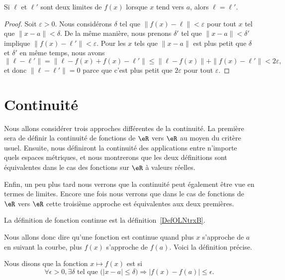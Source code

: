 \begin{lemma}
	Si $\ell$ et $\ell'$ sont deux limites de $f(x)$ lorsque $x$ tend vers $a$, alors $\ell=\ell'$.
\end{lemma}

\begin{proof}
	Soit $\varepsilon>0$. Nous considérons $\delta$ tel que $\| f(x)-\ell \|<\varepsilon$ pour tout $x$ tel que $\| x-a \|<\delta$. De la même manière, nous prenons $\delta'$ tel que $\| x-a \|<\delta'$ implique $\| f(x)-\ell' \|<\varepsilon$. Pour les $x$ tels que $\| x-a \|$ est plus petit que $\delta$ et $\delta'$ en même temps, nous avons
	\begin{equation}
		\| \ell-\ell' \|=\| \ell-f(x)+f(x)-\ell' \|\leq\| \ell-f(x) \|+\| f(x)-\ell' \|<2\varepsilon,
	\end{equation}
	et donc $\| \ell-\ell' \|=0$ parce que c'est plus petit que $2\varepsilon$ pour tout $\varepsilon$.
\end{proof}

\section{Continuité}

Nous allons considérer trois approches différentes de la continuité. La première sera de définir la continuité de fonctions de $\eR$ vers $\eR$ au moyen du critère usuel. Ensuite, nous définiront la continuité des applications entre n'importe quels espaces métriques, et nous montrerons que les deux définitions sont équivalentes dans le cas des fonctions sur $\eR$ à valeurs réelles.

Enfin, un peu plus tard nous verrons que la continuité peut également être vue en termes de limites. Encore une fois nous verrons que dans le cas de fonctions de $\eR$ vers $\eR$ cette troisième approche est équivalentes aux deux premières.

La définition de fonction continue est la définition~\ref{DefOLNtrxB}.

Nous allons donc dire qu'une fonction est continue quand plus $x$ s'approche de $a$ en suivant la courbe, plus $f(x)$ s'approche de $f(a)$. Voici la définition précise.
\begin{definition}      \label{DefContinue}
Nous disons que la fonction $x\mapsto f(x)$ est  si
\begin{equation}
 \forall \epsilon>0,\exists \delta\text{ tel que } \big(| x-a |\leq\delta\big)\Rightarrow | f(x)-f(a) |\leq \epsilon.
\end{equation}
\end{definition}


